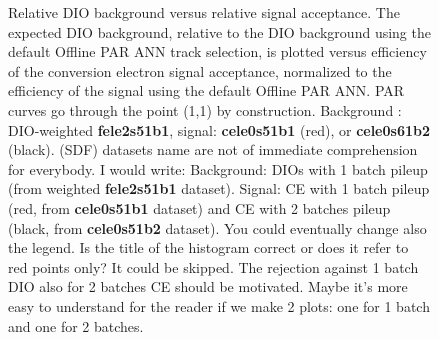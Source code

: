 \begin{figure}[H]
\caption{
  \label{fig:mumem_ann_operational_point_choice}
   {\blue Relative DIO background versus relative signal acceptance.}
  {\blue The e}xpected DIO background,  {\blue relative to} the DIO background  {\blue using the}
  default  {\blue Offline} PAR ANN track selection, is plotted versus efficiency  
  {\blue of the conversion electron signal acceptance}, normalized to the efficiency
  of the  {\blue signal using the default Offline} PAR ANN. 
  PAR curves go through  {\blue the point (1,1)} by construction.
  Background : DIO-weighted {\bf fele2s51b1},  signal: {\bf cele0s51b1} (red), or {\bf cele0s61b2} (black).
  {\blue (SDF) datasets name are not of immediate comprehension for everybody. I would write: Background: DIOs with 1 batch pileup (from weighted  {\bf fele2s51b1} dataset). Signal: CE with 1 batch pileup (red, from  {\bf cele0s51b1} dataset) and CE with 2 batches pileup (black, from  {\bf cele0s51b2} dataset). You could eventually change also the legend. Is the title of the histogram correct or does it refer to red points only? It could be skipped. The rejection against 1 batch DIO also for 2 batches CE should be motivated. Maybe it's more easy to understand for the reader if we make 2 plots: one for 1 batch and one for 2 batches.}
}
\end{figure}
